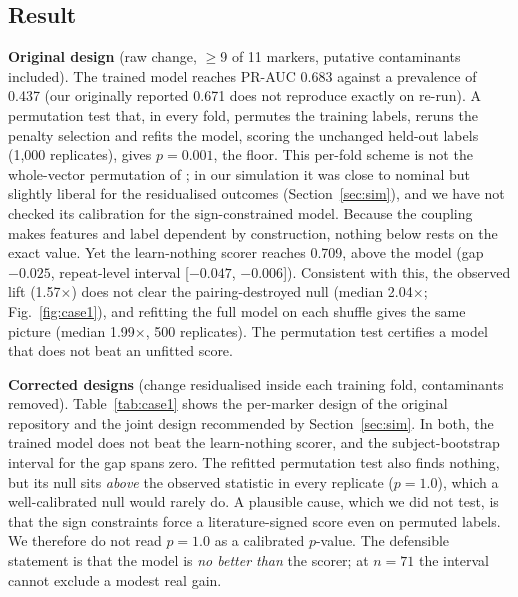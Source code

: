 \documentclass[conference]{IEEEtran}
\newcommand{\verified}[1]{#1}  %
\begin{document}
\subsection{Result}
\textbf{Original design} (raw change, $\geq$9 of 11 markers, putative
contaminants included). The trained model reaches PR-AUC \verified{0.683}
against a prevalence of \verified{0.437} (our originally reported
\verified{0.671} does not reproduce exactly on re-run). A permutation test
that, in every fold, permutes the training labels, reruns the penalty
selection and refits the model, scoring the unchanged held-out labels
(1{,}000 replicates), gives $p=\verified{0.001}$, the floor. This per-fold
scheme is not the whole-vector permutation of \cite{ojala2010}; in our
simulation it was close to nominal but slightly liberal for the residualised
outcomes (Section~\ref{sec:sim}), and we have not checked its calibration for
the sign-constrained model. Because the coupling makes features and label
dependent by construction, nothing below rests on the exact value. Yet the
learn-nothing scorer reaches
\verified{0.709}, above the model (gap \verified{$-0.025$}, repeat-level
interval [\verified{$-0.047$}, \verified{$-0.006$}]). Consistent with this,
the observed lift (\verified{1.57$\times$}) does not clear the
pairing-destroyed null (median \verified{2.04$\times$}; Fig.~\ref{fig:case1}),
and refitting the full model on each shuffle gives the same picture (median
\verified{1.99$\times$}, 500 replicates). The permutation test certifies a
model that does not beat an unfitted score.

\textbf{Corrected designs} (change residualised inside each training fold,
contaminants removed). Table~\ref{tab:case1} shows the per-marker design of
the original repository and the joint design recommended by
Section~\ref{sec:sim}. In both, the trained model does not beat the
learn-nothing scorer, and the subject-bootstrap interval for the gap spans
zero. The refitted permutation test also finds nothing, but its null sits
\emph{above} the observed statistic in every replicate ($p=1.0$), which a
well-calibrated null would rarely do. A plausible cause, which we did not
test, is that the sign constraints force a literature-signed score even on
permuted labels. We therefore do not read $p=1.0$ as a calibrated $p$-value.
The defensible statement is that the model is \emph{no better than} the
scorer; at $n=71$ the interval cannot exclude a modest real gain.
\end{document}
